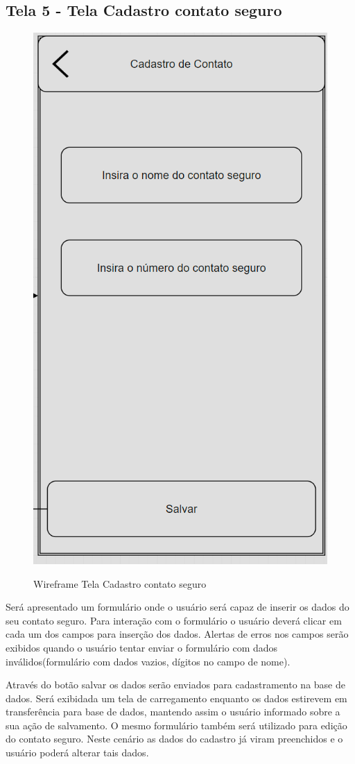 \subsection{Tela 5 - Tela Cadastro contato seguro}
\begin{figure}[h]
  \begin{center}
  \includegraphics[width=0.2\linewidth]{images/wire-tela-cadsatro-contato-seguro.png}\\
  \end{center}
  \caption[Wireframe Tela Cadastro contato seguro]{Wireframe Tela Cadastro contato seguro}
  \label{fig:wireframe-tela-cadastro-contato-seguro}
\end{figure}
\pagebreak
Será apresentado um formulário onde o usuário será capaz de inserir os dados do seu contato seguro. Para interação com o formulário o usuário deverá clicar em cada um dos campos para inserção dos dados. Alertas de erros nos campos serão exibidos quando o usuário tentar enviar o formulário com dados inválidos(formulário com dados vazios, dígitos no campo de nome). 

Através do botão salvar os dados serão enviados para cadastramento na base de dados. Será exibidada um tela de carregamento enquanto os dados estirevem em transferência para base de dados, mantendo assim o usuário informado sobre a sua ação de salvamento. O mesmo formulário também será utilizado para edição do contato seguro. Neste cenário as dados do cadastro já viram preenchidos e o usuário poderá alterar tais dados.

